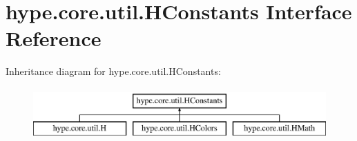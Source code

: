 \hypertarget{interfacehype_1_1core_1_1util_1_1_h_constants}{\section{hype.\-core.\-util.\-H\-Constants Interface Reference}
\label{interfacehype_1_1core_1_1util_1_1_h_constants}
}
Inheritance diagram for hype.\-core.\-util.\-H\-Constants\-:\begin{figure}[H]
\begin{center}
\leavevmode
\includegraphics[height=2.000000cm]{interfacehype_1_1core_1_1util_1_1_h_constants}
\end{center}
\end{figure}
